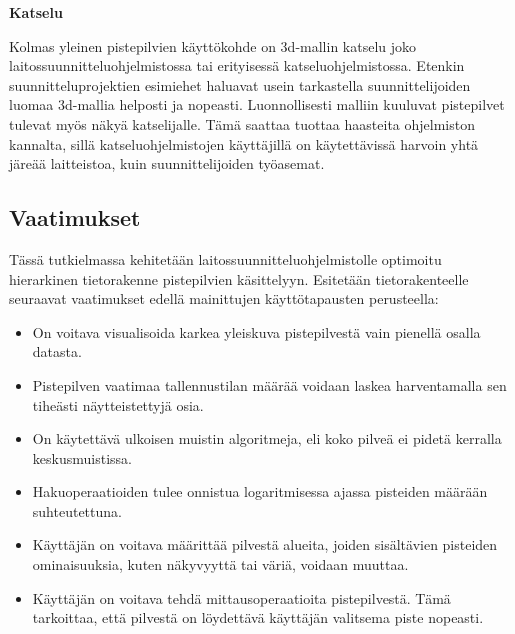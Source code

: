 \large\textbf{Katselu}
\normalsize

\noindent Kolmas yleinen pistepilvien käyttökohde on 3d-mallin katselu joko laitossuunnitteluohjelmistossa tai erityisessä katseluohjelmistossa. Etenkin suunnitteluprojektien esimiehet haluavat usein tarkastella suunnittelijoiden luomaa 3d-mallia helposti ja nopeasti. Luonnollisesti malliin kuuluvat pistepilvet tulevat myös näkyä katselijalle. Tämä saattaa tuottaa haasteita ohjelmiston kannalta, sillä katseluohjelmistojen käyttäjillä on käytettävissä harvoin yhtä järeää laitteistoa, kuin suunnittelijoiden työasemat.   

\subsection{Vaatimukset}
Tässä tutkielmassa kehitetään laitossuunnitteluohjelmistolle optimoitu hierarkinen tietorakenne pistepilvien käsittelyyn. Esitetään tietorakenteelle seuraavat vaatimukset edellä mainittujen käyttötapausten perusteella:
\begin{itemize}
    \item On voitava visualisoida karkea yleiskuva pistepilvestä vain pienellä osalla datasta. 
    \item Pistepilven vaatimaa tallennustilan määrää voidaan laskea harventamalla sen tiheästi näytteistettyjä osia. 
    \item On käytettävä ulkoisen muistin algoritmeja, eli koko pilveä ei pidetä kerralla keskusmuistissa.
    \item Hakuoperaatioiden tulee onnistua logaritmisessa ajassa pisteiden määrään suhteutettuna.
    \item Käyttäjän on voitava määrittää pilvestä alueita, joiden sisältävien pisteiden ominaisuuksia, kuten näkyvyyttä tai väriä, voidaan muuttaa.
    \item Käyttäjän on voitava tehdä mittausoperaatioita pistepilvestä. Tämä tarkoittaa, että pilvestä on löydettävä käyttäjän valitsema piste nopeasti. 
\end{itemize}

